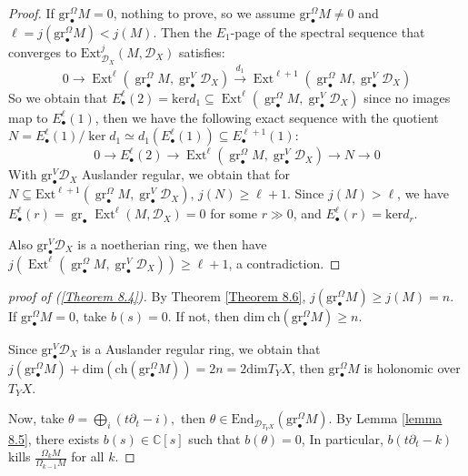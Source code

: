 \documentclass[openany]{book}
\theoremstyle{definition} %
\theoremstyle{remark}
\begin{document}
\begin{proof}
    If $\mathrm{gr}^\Omega_{\bullet}M=0$, nothing to prove, so we assume $\mathrm{gr}^\Omega_{\bullet}M\neq 0$ and $\ell=j(\mathrm{gr}_{\bullet}^{\Omega}M)<j(M)$.
    Then the $E_1$-page of the spectral sequence that converges to $\mathrm{Ext}_{\mathcal{D}_{X}}^{j}(M,\mathcal{D}_{X})$ satisfies:$$0 \rightarrow \operatorname{Ext}^{\ell}(\operatorname{gr}_{\bullet}^{\Omega} M, \operatorname{gr}^{V}_{\bullet}\mathcal{D}_X)
        \xrightarrow{d_1}
        \operatorname{Ext}^{\ell+1}(\operatorname{gr}_{\bullet}^{\Omega} M, \operatorname{gr}^{V}_{\bullet}\mathcal{D}_X)$$So we obtain that $E^{\ell}_{\bullet}(2)=\mathrm{ker}d_{1}\subseteq\operatorname{Ext}^{\ell}(\operatorname{gr}_{\bullet}^{\Omega} M, \operatorname{gr}^{V}_{\bullet}\mathcal{D}_X)$ since no images map to $E^{\ell}_{\bullet}(1)$, then we have the following exact sequence with the quotient $N=E^{\ell}_{\bullet}(1) /\ker d_{1}\simeq d_{1}(E_{\bullet}^{\ell}(1))\subseteq E^{\ell+1}_{\bullet}(1)$: $$0 \rightarrow E_{\bullet}^{\ell}(2) \rightarrow \operatorname{Ext}^{\ell}(\operatorname{gr}_{\bullet}^{\Omega} M, \operatorname{gr}^{V}_{\bullet}\mathcal{D}_X)
        \rightarrow N \rightarrow 0$$With $\mathrm{gr}_{\bullet}^V\mathcal{D}_{X}$ Auslander regular, we obtain that for $N\subseteq \mathrm{Ext}^{\ell+1}(\operatorname{gr}_{\bullet}^{\Omega} M, \operatorname{gr}^{V}_{\bullet}\mathcal{D}_X)$, $j(N)\ge \ell+1$.
    Since $j(M)>\ell$, we have $E_{\bullet}^{\ell}(r) = \operatorname{gr}_{\bullet} \operatorname{Ext}^{\ell}(M, \mathcal{D}_X) = 0$ for some $r\gg 0$, and $E^{\ell}_{\bullet}(r)=\mathrm{ker}d_{r}.$

    Also $\mathrm{gr}_{\bullet}^V\mathcal{D}_{X}$ is a noetherian ring, we then have $j(\operatorname{Ext}^{\ell}(\operatorname{gr}_{\bullet}^{\Omega} M, \operatorname{gr}^{V}_{\bullet}\mathcal{D}_X) )\ge\ell+1$, a contradiction.

\end{proof}


\begin{proof}[proof of (\ref{Theorem 8.4})]
    \quad

    By Theorem \ref{Theorem 8.6}, $j(\mathrm{gr}_{\bullet}^\Omega M)\ge j(M)=n$. If $\mathrm{gr}_{\bullet}^\Omega M=0$, take $b(s)=0$. If not, then $\mathrm{dim\ ch}(\mathrm{gr}^\Omega_{\bullet}M)\ge n$.

    Since $\mathrm{gr}_{\bullet}^V\mathcal{D}_{X}$ is a Auslander regular ring, we obtain that $j(\mathrm{gr}_{\bullet}^\Omega M)+\mathrm{dim}(\mathrm{ch}(\mathrm{gr}_{\bullet}^\Omega M))=2n=2\mathrm{dim}T_{Y}X$, then $\mathrm{gr}^\Omega_{\bullet} M$ is holonomic over $T_Y X$.

    Now, take $\theta=\bigoplus \limits_{i}(t\partial_{t}-i),$ then $\theta\in\mathrm{End}_{\mathcal{D}_{T_{Y}X}}(\mathrm{gr}_{\bullet}^\Omega M)$. By Lemma \ref{lemma 8.5}, there exists $b(s)\in\mathbb{C}[s]$ such that $b(\theta)=0$, In particular, $b(t\partial_{t}-k)$ kills $\frac{\Omega_{k}M}{\Omega_{k-1}M}$ for all $k$.
\end{proof}
\end{document}
